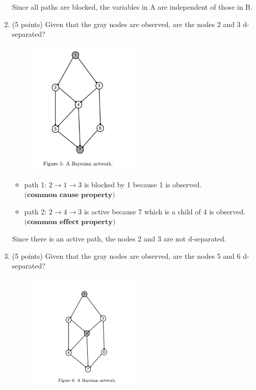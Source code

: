 \documentclass[a3paper,12pt]{extarticle} %
\begin{document}
\begin{enumerate}
\begin{itemize}
    \end{itemize}
    Since all paths are blocked, the variables in A are independent of those in B.
    \item (5 points) Given that the gray nodes are observed, are the nodes 2 and 3 d-separated?
    \begin{figure}[h!]
        \centering
        \includegraphics[width=0.5\textwidth]{dseperation_2.png}
        \label{fig:example_image}
    \end{figure}
    \begin{itemize}
        \item path 1: \(2 \rightarrow 1 \rightarrow 3\) is blocked by 1 because 1 is observed. \(\textbf{(common cause property)}\)
        \item path 2: \(2 \rightarrow 4 \rightarrow 3\) is active because 7 which is a child of 4  is observed. \(\textbf{(common effect property)}\)
    \end{itemize}
    Since there is an active path, the nodes 2 and 3 are not d-separated.
    \vspace{22cm}
    \item (5 points) Given that the gray nodes are observed, are the nodes 5 and 6 d-separated?
    \begin{figure}[h!]
        \centering
        \includegraphics[width=0.5\textwidth]{dseperation_3.png}

\end{figure}
\end{enumerate}
\end{document}
